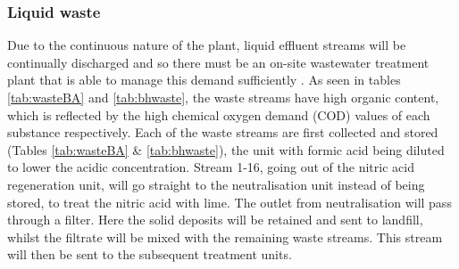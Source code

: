 \subsubsection{Liquid waste}

Due to the continuous nature of the plant, liquid effluent streams will be continually discharged and so there must be an on-site wastewater treatment plant that is able to manage this demand sufficiently \cite{water_innovations_inc_continuous_2021}.  As seen in tables \ref{tab:wasteBA} and \ref{tab:bhwaste}, the waste streams have high organic content, which is reflected by the high chemical oxygen demand (COD) values of each substance respectively. Each of the waste streams are first collected and stored (Tables \ref{tab:wasteBA} \& \ref{tab:bhwaste}), the unit with formic acid being diluted to lower the acidic concentration. Stream 1-16, going out of the nitric acid regeneration unit, will go straight to the neutralisation unit instead of being stored, to treat the nitric acid with lime. The outlet from neutralisation will pass through a filter. Here the solid deposits will be retained and sent to landfill, whilst the filtrate will be mixed with the remaining waste streams. This stream will then be sent to the subsequent treatment units. 

